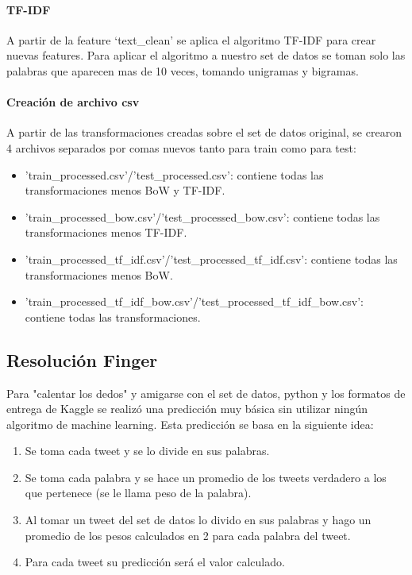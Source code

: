 \documentclass[12pt]{article}
\begin{document}
\paragraph{TF-IDF\\}
A partir de la feature ‘text\_clean’ se aplica el algoritmo TF-IDF para crear nuevas features.
Para aplicar el algoritmo a nuestro set de datos se toman solo las palabras que aparecen mas de 10 veces, tomando unigramas y bigramas.

\paragraph{Creación de archivo csv\\}
A partir de las transformaciones creadas sobre el set de datos original, se crearon 4 archivos separados por comas nuevos tanto para train como para test:

\begin{itemize}
  \item 'train\_processed.csv'/'test\_processed.csv': contiene todas las transformaciones menos BoW y TF-IDF.
  \item 'train\_processed\_bow.csv'/'test\_processed\_bow.csv': contiene todas las transformaciones menos TF-IDF.
  \item 'train\_processed\_tf\_idf.csv'/'test\_processed\_tf\_idf.csv': contiene todas las transformaciones menos BoW.
  \item 'train\_processed\_tf\_idf\_bow.csv'/'test\_processed\_tf\_idf\_bow.csv': contiene todas las transformaciones.
\end{itemize}


\newpage
\subsection{Resolución Finger}
Para "calentar los dedos" y amigarse con el set de datos, python y los formatos de entrega de Kaggle se realizó una predicción muy básica sin utilizar ningún algoritmo de machine learning.
Esta predicción se basa en la siguiente idea: 

\begin{enumerate}
  \item Se toma cada tweet y se lo divide en sus palabras.
  \item Se toma cada palabra y se hace un promedio de los tweets verdadero a los que pertenece (se le llama peso de la palabra).
  \item Al tomar un tweet del set de datos lo divido en sus palabras y hago un promedio de los pesos calculados en 2 para cada palabra del tweet.
  \item Para cada tweet su predicción será el valor calculado.
\end{enumerate}
\end{document}
